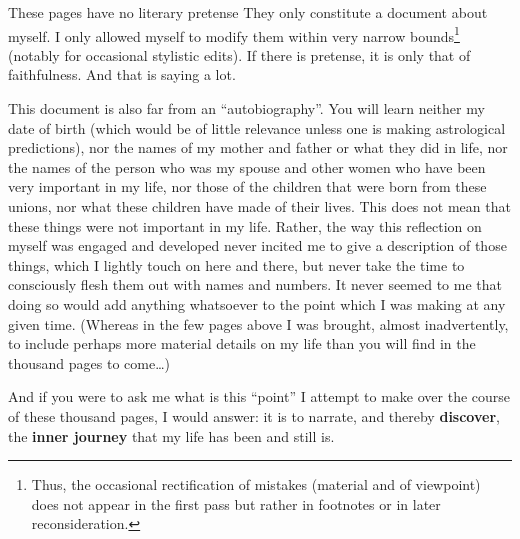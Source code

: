 These pages have no literary pretense 
They only constitute a document about myself. I only allowed myself to modify them within 
very narrow bounds\footnote{Thus, the occasional rectification of mistakes (material
and of viewpoint) does not appear in the first pass but rather in 
footnotes or in later reconsideration.} (notably for occasional stylistic edits). If there
is pretense, it is only that of faithfulness. And that is saying a lot. 

This document is also far from an ``autobiography''. 
You will learn neither my date of birth (which would be of little relevance unless one is
making astrological predictions), nor the names of my mother and father 
or what they did in life, nor the names of the person who was my spouse and other women
who have been very important in my life, nor those of the children that were born from
these unions, nor what these children have made of their lives.
This does not mean that these things were not important in my life. Rather, the way this
reflection on myself was engaged and developed never incited me to give a description of
those things, which I lightly touch on here and there, but never take the time to
consciously flesh them out with names and numbers. It never seemed to me that doing so
would add anything whatsoever to the point which I was making at any given time. (Whereas
in the few pages above I was brought, almost inadvertently, 
to include perhaps more material details on my life than
you will find in the thousand pages to come\ldots)

And if you were to ask me what is this ``point'' I attempt to make over the course of
these thousand pages, I would answer: it is to narrate, and thereby \textbf{discover}, 
the \textbf{inner journey} that my life has been and still is. 

